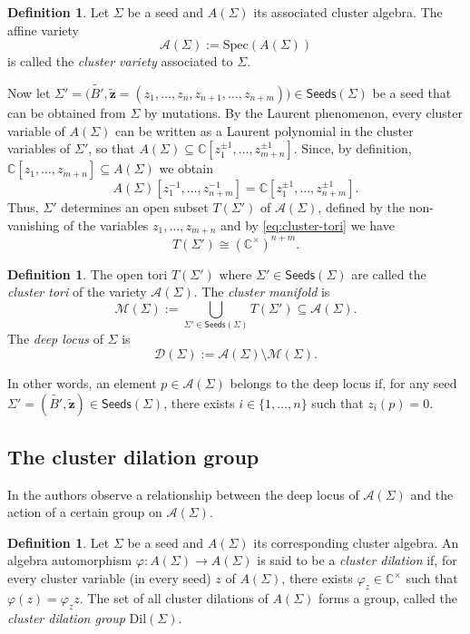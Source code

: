 \documentclass{amsart}
\newcommand{\seed}{\Sigma}
\newcommand{\excluster}[1]{\widetilde{\mathbf{#1}}}
\newcommand{\exmatrix}[1]{\widetilde{#1}}
\newcommand{\var}{\mathcal{A}}
\newcommand{\deep}{\mathcal{D}}
\newcommand{\manifold}{\mathcal{M}}
\newcommand{\C}{\mathbb{C}}
\newcommand{\Spec}{\mathrm{Spec}}
\newcommand{\seeds}{\mathsf{Seeds}}
\numberwithin{equation}{section}
\theoremstyle{definition}
\newtheorem{definition}[theorem]{Definition}
\newcommand{\dil}{\mathrm{Dil}}
\begin{document}
\begin{definition}
    Let $\seed$ be a seed and $A(\seed)$ its associated cluster algebra. The affine variety
    \[
    \var(\seed) := \Spec(A(\seed))
    \]
    is called the \emph{cluster variety} associated to $\seed$. 
\end{definition}

Now let $\seed' = \big (\exmatrix{B'}, \excluster{z} = (z_1, \dots, z_n, z_{n+1}, \dots, z_{n+m})\big) \in \seeds(\seed)$ be a seed that can be obtained from $\seed$ by mutations. By the Laurent phenomenon, every cluster variable of $A(\seed)$ can be written as a Laurent polynomial in the cluster variables of $\seed'$, so that $A(\seed) \subseteq \C[z_1^{\pm 1}, \dots, z_{m+n}^{\pm 1}]$. Since, by definition, $\C[z_1, \dots, z_{m+n}] \subseteq A(\seed)$ we obtain
\begin{equation}\label{eq:cluster-tori}
A(\seed)[z_1^{-1}, \dots, z_{n+m}^{-1}] = \C[z_1^{\pm 1}, \dots, z_{n+m}^{\pm 1}]. 
\end{equation}
Thus, $\seed'$ determines an open subset $T(\seed')$ of $\var(\seed)$, defined by the non-vanishing of the variables $z_1, \dots, z_{m+n}$ and by \eqref{eq:cluster-tori} we have
\[
T(\seed') \cong (\C^{\times})^{n+m}.
\]

\begin{definition}
    The open tori $T(\seed')$ where $\seed' \in \seeds(\seed)$ are called the \emph{cluster tori} of the variety $\var(\seed)$. The \emph{cluster manifold} is
    \[
    \manifold(\seed) := \bigcup_{\seed' \in \seeds(\seed)}T(\seed') \subseteq \var(\seed). 
    \]
    The \emph{deep locus} of $\seed$ is
    \[
    \deep(\seed) := \var(\seed) \setminus \manifold(\seed). 
    \]
\end{definition}

In other words, an element $p \in \var(\seed)$ belongs to the deep locus if, for any seed $\seed' = (\exmatrix{B'}, \excluster{z}) \in \seeds(\seed)$, there exists $i \in \{1, \dots, n\}$ such that $z_i(p) = 0$. 

\subsection{The cluster dilation group} In \cite{deep} the authors observe a relationship between the deep locus of $\var(\seed)$ and the action of a certain group on $\var(\seed)$. 

\begin{definition}
    Let $\seed$ be a seed and $A(\seed)$ its corresponding cluster algebra. An algebra automorphism $\varphi: A(\seed) \to A(\seed)$ is said to be a \emph{cluster dilation} if, for every cluster variable (in every seed) $z$ of $A(\seed)$, there exists $\varphi_z \in \C^{\times}$ such that $\varphi(z) = \varphi_zz$. The set of all cluster dilations of $A(\seed)$ forms a group, called the \emph{cluster dilation group} $\dil(\seed)$. 
\end{definition}
\end{document}
